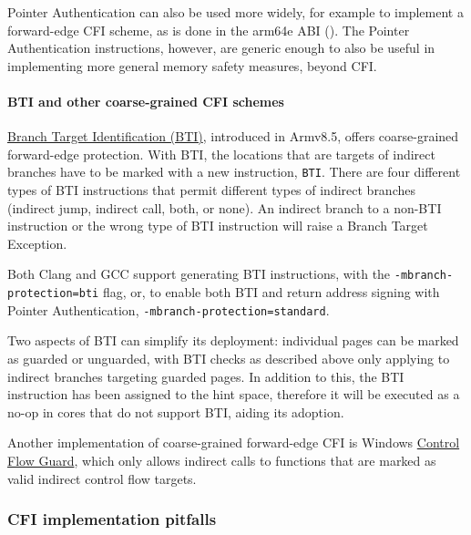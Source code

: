 \documentclass[
  a4paper,
]{report}
\begin{document}
Pointer Authentication can also be used more widely, for example to
implement a forward-edge CFI scheme, as is done in the arm64e ABI
(). The Pointer
Authentication instructions, however, are generic enough to also be
useful in implementing more general memory safety measures, beyond CFI.

\paragraph{BTI and other coarse-grained CFI schemes}\label{sec:bti}

\href{https://developer.arm.com/documentation/102433/0100/Jump-oriented-programming?lang=en}{\label{__index_entry_59}{Branch
Target Identification (BTI)}},
introduced in Armv8.5, offers coarse-grained forward-edge protection.
With BTI, the locations that are targets of indirect branches have to be
marked with a new instruction, \texttt{BTI}. There are four different
types of BTI instructions that permit different types of indirect
branches (indirect jump, indirect call, both, or none). An indirect
branch to a non-BTI instruction or the wrong type of BTI instruction
will raise a Branch Target Exception.

Both Clang and GCC support generating BTI instructions, with the
\texttt{-mbranch-protection=bti} flag, or, to enable both BTI and return
address signing with Pointer Authentication,
\texttt{-mbranch-protection=standard}.

Two aspects of BTI can simplify its deployment: individual pages can be
marked as guarded or unguarded, with BTI checks as described above only
applying to indirect branches targeting guarded pages. In addition to
this, the BTI instruction has been assigned to the hint space, therefore
it will be executed as a no-op in cores that do not support BTI, aiding
its adoption.

Another implementation of coarse-grained forward-edge CFI is Windows
\href{https://docs.microsoft.com/en-us/windows/win32/secbp/control-flow-guard}{Control
Flow Guard}, which only allows indirect calls to functions that are
marked as valid indirect control flow targets.

\subsubsection{CFI implementation
pitfalls}\label{cfi-implementation-pitfalls}
\end{document}
